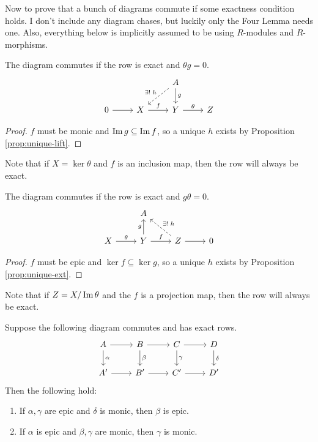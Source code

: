 \documentclass[twoside,10pt]{report}
\begin{document}
Now to prove that a bunch of diagrams commute if some exactness condition holds. I don't include any diagram chases, but luckily only the Four Lemma needs one. Also, everything below is implicitly assumed to be using $R$-modules and $R$-morphisms.
\begin{prop}
The diagram commutes if the row is exact and $\theta g = 0$.
\[
\begin{tikzcd}
	& & A \arrow[dl, dashed, "\exists! \;h"'] \dar{g} \\
	0 \rar & X \rar{f} & Y \rar{\theta} & Z
\end{tikzcd}
\] 
\end{prop}
\begin{proof}
	$f$ must be monic and $\operatorname{Im} g \subseteq \operatorname{Im} f$, so a unique $h$ exists by Proposition \ref{prop:unique-lift}.
\end{proof}

Note that if $X = \ker \theta$ and $f$ is an inclusion map, then the row will always be exact.

\begin{prop}
The diagram commutes if the row is exact and $g\theta=0$.
\[
\begin{tikzcd}
	& A \\
	X \rar{\theta} & Y \uar{g}\rar{f} & Z \rar\arrow[ul, dashed, "\exists!\; h"'] & 0
\end{tikzcd}
\] 
\end{prop}
\begin{proof}
	$f$ must be epic and $\ker f \subseteq \ker g$, so a unique $h$ exists by Proposition \ref{prop:unique-ext}.
\end{proof}

Note that if $Z = X / \operatorname{Im} \theta$ and the $f$ is a projection map, then the row will always be exact.

\begin{thrm}
Suppose the following diagram commutes and has exact rows.
\[
\begin{tikzcd}
	A \rar\dar{\alpha} & B \rar\dar{\beta} & C\rar\dar{\gamma} & D\dar{\delta} \\
	A'\rar & B'\rar & C'\rar & D'
\end{tikzcd}
\] Then the following hold:
\begin{enumerate}
	\item If $\alpha,\gamma$ are epic and $\delta$ is monic, then $\beta$ is epic.
	\item If $\alpha$ is epic and $\beta,\gamma$ are monic, then $\gamma$ is monic.
\end{enumerate}
\end{thrm}
\end{document}

